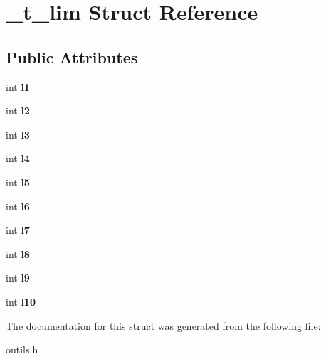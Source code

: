 \hypertarget{struct__t__lim}{}\section{\+\_\+t\+\_\+lim Struct Reference}
\label{struct__t__lim}
\subsection*{Public Attributes}
\begin{DoxyCompactItemize}
\item 
int {\bfseries l1}\hypertarget{struct__t__lim_ad24a97fe2fc2862ba258241d8a74a952}{}\label{struct__t__lim_ad24a97fe2fc2862ba258241d8a74a952}

\item 
int {\bfseries l2}\hypertarget{struct__t__lim_acc724347cf08ad963ec9b7fc4314eff9}{}\label{struct__t__lim_acc724347cf08ad963ec9b7fc4314eff9}

\item 
int {\bfseries l3}\hypertarget{struct__t__lim_a5f80e5a7e9c9c836552fcf3d4fd82db8}{}\label{struct__t__lim_a5f80e5a7e9c9c836552fcf3d4fd82db8}

\item 
int {\bfseries l4}\hypertarget{struct__t__lim_a9ee8fa0f6b5668f44b6d7d217bea0b97}{}\label{struct__t__lim_a9ee8fa0f6b5668f44b6d7d217bea0b97}

\item 
int {\bfseries l5}\hypertarget{struct__t__lim_a96ec033a6ff3203e6f79c91a4557fc52}{}\label{struct__t__lim_a96ec033a6ff3203e6f79c91a4557fc52}

\item 
int {\bfseries l6}\hypertarget{struct__t__lim_afcbae9dd8fe242062a714b7838793b86}{}\label{struct__t__lim_afcbae9dd8fe242062a714b7838793b86}

\item 
int {\bfseries l7}\hypertarget{struct__t__lim_a24940558519a1e62a3d7f0a9ac0b0329}{}\label{struct__t__lim_a24940558519a1e62a3d7f0a9ac0b0329}

\item 
int {\bfseries l8}\hypertarget{struct__t__lim_a8def6dfcd28d356f4d5f93c7f0d9f1ff}{}\label{struct__t__lim_a8def6dfcd28d356f4d5f93c7f0d9f1ff}

\item 
int {\bfseries l9}\hypertarget{struct__t__lim_a6bfec49df206bf385fe731607d1e2378}{}\label{struct__t__lim_a6bfec49df206bf385fe731607d1e2378}

\item 
int {\bfseries l10}\hypertarget{struct__t__lim_a2566022be0783ae2b3bd4318ed875db1}{}\label{struct__t__lim_a2566022be0783ae2b3bd4318ed875db1}

\end{DoxyCompactItemize}


The documentation for this struct was generated from the following file\+:\begin{DoxyCompactItemize}
\item 
outils.\+h\end{DoxyCompactItemize}
